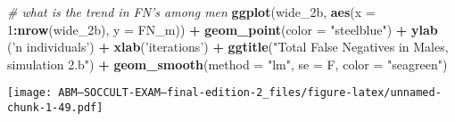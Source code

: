 \documentclass[]{article}
\newenvironment{Shaded}{\begin{snugshade}}{\end{snugshade}}
\newcommand{\KeywordTok}[1]{\textcolor[rgb]{0.13,0.29,0.53}{\textbf{#1}}}
\newcommand{\DataTypeTok}[1]{\textcolor[rgb]{0.13,0.29,0.53}{#1}}
\newcommand{\DecValTok}[1]{\textcolor[rgb]{0.00,0.00,0.81}{#1}}
\newcommand{\StringTok}[1]{\textcolor[rgb]{0.31,0.60,0.02}{#1}}
\newcommand{\CommentTok}[1]{\textcolor[rgb]{0.56,0.35,0.01}{\textit{#1}}}
\newcommand{\OperatorTok}[1]{\textcolor[rgb]{0.81,0.36,0.00}{\textbf{#1}}}
\newcommand{\NormalTok}[1]{#1}
\begin{document}
\begin{Shaded}
\begin{Highlighting}[]
\CommentTok{# what is the trend in FN's among men}
\KeywordTok{ggplot}\NormalTok{(wide_2b, }\KeywordTok{aes}\NormalTok{(}\DataTypeTok{x =} \DecValTok{1}\OperatorTok{:}\KeywordTok{nrow}\NormalTok{(wide_2b), }\DataTypeTok{y =}\NormalTok{ FN_m)) }\OperatorTok{+}\StringTok{ }
\StringTok{  }\KeywordTok{geom_point}\NormalTok{(}\DataTypeTok{color =} \StringTok{"steelblue"}\NormalTok{) }\OperatorTok{+}
\StringTok{  }\KeywordTok{ylab}\NormalTok{ (}\StringTok{'n individuals'}\NormalTok{) }\OperatorTok{+}\StringTok{ }\KeywordTok{xlab}\NormalTok{(}\StringTok{'iterations'}\NormalTok{) }\OperatorTok{+}
\StringTok{  }\KeywordTok{ggtitle}\NormalTok{(}\StringTok{"Total False Negatives in Males, simulation 2.b"}\NormalTok{) }\OperatorTok{+}
\StringTok{  }\KeywordTok{geom_smooth}\NormalTok{(}\DataTypeTok{method =} \StringTok{"lm"}\NormalTok{, }\DataTypeTok{se =}\NormalTok{ F, }\DataTypeTok{color =} \StringTok{"seagreen"}\NormalTok{)}
\end{Highlighting}
\end{Shaded}

\texttt{[image: ABM---SOCCULT-EXAM---final-edition-2\_files/figure-latex/unnamed-chunk-1-49.pdf]}
\end{document}
